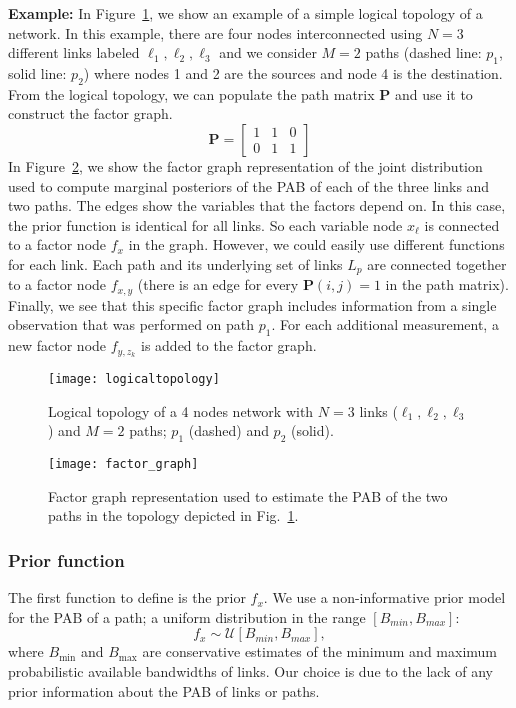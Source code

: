 \documentclass[final,5p,times,twocolumn]{elsarticle}
\begin{document}
{\bf Example:} In Figure~\ref{fig:logicaltopology}, we show an example of a simple logical topology of a network.  In this example, there are four nodes interconnected using $N=3$ different links labeled $\ell_1,\ell_2,\ell_3$ and we consider $M=2$ paths (dashed line: $p_1$, solid line: $p_2$) where nodes 1 and 2 are the sources and node 4 is the destination.  From the logical topology, we can populate the path matrix $\mathbf{P}$ and use it to construct the factor graph.
$$\mathbf{P} = \left[\begin{array} {ccc} 1 & 1 & 0 \\ 0 & 1 & 1\end{array} \right]$$
In Figure~\ref{fig:factor_graph}, we show the factor graph representation of the joint distribution used to compute marginal posteriors of the PAB of each of the three links and two paths.  The edges show the variables that the factors depend on.  In this case, the prior function is identical for all links.  So each variable node $x_\ell$ is connected to a factor node $f_x$ in the graph.  However, we could easily use different functions for each link.  Each path and its underlying set of links $L_p$ are connected together to a factor node $f_{x,y}$ (there is an edge for every $\mathbf{P}(i,j)=1$ in the path matrix).  Finally, we see that this specific factor graph includes information from a single observation that was performed on path $p_1$.  For each additional measurement, a new factor node $f_{y,z_k}$ is added to the factor graph.

\begin{figure}[!h]
\centering
	\texttt{[image: logicaltopology]}
	\caption{Logical topology of a 4 nodes network with $N=3$ links ($\ell_1,\ell_2,\ell_3$) and $M=2$ paths; $p_1$ (dashed) and $p_2$ (solid).  \label{fig:logicaltopology}}
\end{figure}

\begin{figure}
\centering
			\texttt{[image: factor\_graph]}
\caption{Factor graph representation used to estimate the PAB of the two paths in the topology depicted in Fig.~\ref{fig:logicaltopology}.\label{fig:factor_graph}}
\end{figure}



\subsubsection{Prior function}
The first function to define is the prior $f_x$.  We use a non-informative prior model for the PAB of a path; a uniform distribution in the range $[B_{min},B_{max}]$: $$f_x \sim \mathcal{U}[B_{min},B_{max}],$$where $B_{\min}$ and $B_{\max}$ are conservative estimates of the minimum and maximum probabilistic available bandwidths of links.  Our choice is due to the lack of any prior information about the PAB of links or paths.
\end{document}
